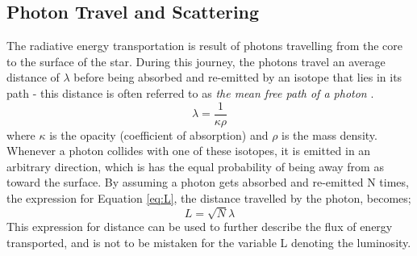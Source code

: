 \documentclass[10pt, nofootinbib, twocolumn]{revtex4-1}
\begin{document}
\subsection{Photon Travel and Scattering}
The radiative energy transportation is result of photons travelling from the core to the surface of the star. During this journey, the photons travel an average distance of $\lambda $ before being absorbed and re-emitted by an isotope that lies in its path - this distance is often referred to as \textit{the mean free path of a photon} \cite{ast}. 
\begin{equation}\label{eq:lambda}
    \lambda = \frac{1}{\kappa \rho}
\end{equation}
where $\kappa$ is the opacity (coefficient of absorption) and $\rho$ is the mass density. Whenever a photon collides with one of these isotopes, it is emitted in an arbitrary direction, which is has the equal probability of being away from as toward the surface. By assuming a photon gets absorbed and re-emitted N times, the expression for Equation \eqref{eq:L}, the distance travelled by the photon, becomes; \\
\begin{equation}\label{eq:L}
    L=\sqrt{N}\lambda
\end{equation}
This expression for distance can be used to further describe the flux of energy transported, and is not to be mistaken for the variable L denoting the luminosity. 
\end{document}
